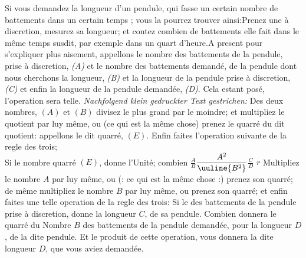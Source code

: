 \vspace*{8mm}
\pstart 
\normalsize
\noindent[56~v\textsuperscript{o}] Si vous demandez la longueur d'un pendule\protect{}, qui fasse un certain nombre de battements  dans un certain temps ; vous la pourrez trouver ainsi:\pend \pstart  Prenez une  \`{a} discretion, mesurez sa longueur; et contez combien de battements elle fait dans le m\^{e}me temps susdit, par exemple dans un quart  d'heure.\pend \pstart  A present pour s'expliquer plus aisement, appellons le nombre des battements de  la pendule, prise \`{a} discretion, \textit{(A)} et le nombre des battements  demand\'{e}, de la pendule dont nous cherchons la longueur, \textit{(B)}  et la longueur de la pendule prise \`{a} discretion, \textit{(C)}  et enfin la longueur de la pendule demand\'{e}e, \textit{(D)}.  Cela estant pos\'{e}, l'operation sera telle.\pend
\vspace*{1mm} \pstart
\lbrack \textit{Nachfolgend klein gedruckter Text gestrichen:}\rbrack \pend \pstart 
\footnotesize
Des deux nombres, $(A)$ et $(B)$ divisez le plus grand par le moindre; et multipliez le quotient par luy m\^{e}me, ou (ce qui est  la m\^{e}me chose) prenez le quarr\'{e} du dit quotient: appellons le dit quarr\'{e}, $(E)$.\pend \pstart
\footnotesize
Enfin faites l'operation suivante de la regle des trois;\\
Si le nombre quarr\'{e} $(E)$, donne l'Unit\'{e}; combien\pend
\vspace*{1mm}\pstart
\footnotesize
$\displaystyle \frac{A}{B}$\hspace*{2mm}$\displaystyle\frac{A^{2}}{\uuline{{B}^{2}}}$\hspace*{2mm}$\displaystyle\frac{C}{D}$\pend \pstart 
\hspace*{6mm}$r$\pend \vspace{1mm} \pstart 
 \normalsize
Multipliez le nombre $A$ par luy m\^{e}me, ou (: ce qui est la m\^{e}me chose :) prenez son quarr\'{e}; de m\^{e}me multipliez le nombre $B$ par luy m\^{e}me, ou prenez son quarr\'{e};  et enfin faites une telle operation de la regle des trois:\pend\pstart
Si le   des battements de la pendule prise \`{a} discretion, donne la longueur $C$, de sa pendule.\pend\pstart
Combien donnera le quarr\'{e} du Nombre  $B$ des battements de la pendule demand\'{e}e,  pour la longueur $D$, de la dite pendule.\pend \pstart 
Et le produit de cette operation, vous donnera la dite longueur $D$, que vous aviez demand\'{e}e.\pend

